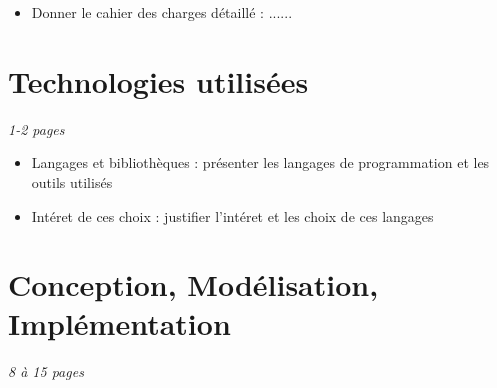 \documentclass[a4paper]{article}
\begin{document}
\begin{itemize}
{2 approches sont possibles : ce qu'on a fait, ou alors faire le truc des particules.
On aurait pu faire la simulation avec le truc des particules pour de meilleurs performances
et une physique plus proche de la rélité, mais on a commencé par faire la simulation avec une 
grille. On a discuté vers la fin du projet de passer aux particules mais on a finalement réussi 
à obtenir un résultat plutot satisfaisant en restant sur la grille (meme si le résultat ne colle 
donc pas parfaitement à la réalité).
}

\item Donner le cahier des charges détaillé : 
......


\end{itemize}

\section{Technologies utilisées}
\emph{1-2 pages}
\begin{itemize}
\item Langages et bibliothèques : présenter les langages de programmation et les outils utilisés
\item Intéret de ces choix : justifier l'intéret et les choix de ces langages 
\end{itemize}


\section{Conception, Modélisation, Implémentation} 
\emph{8 à 15 pages}
\end{document}
